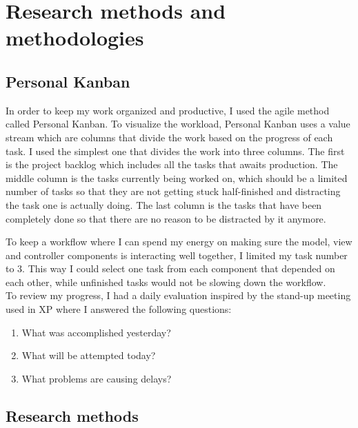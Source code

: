 
\chapter{Research methods and methodologies} %

\label{Chapter3} %


\section{Personal Kanban}
In order to keep my work organized and productive, I used the agile method called Personal Kanban. To visualize the workload, Personal Kanban uses a value stream which are columns that divide the work based on the progress of each task. I used the simplest one that divides the work into three columns. The first is the project backlog which includes all the tasks that awaits production. The middle column is the tasks currently being worked on, which should be a limited number of tasks so that they are not getting stuck half-finished and distracting the task one is actually doing. The last column is the tasks that have been completely done so that there are no reason to be distracted by it anymore. \parencite{Reference1}

To keep a workflow where I can spend my energy on making sure the model, view and controller components is interacting well together, I limited my task number to 3. This way I could select one task from each component that depended on each other, while unfinished tasks would not be slowing down the workflow.\\
To review my progress, I had a daily evaluation inspired by the stand-up meeting used in XP \parencite{Reference2} where I answered the following questions:
\begin{enumerate}
\item What was accomplished yesterday?
\item What will be attempted today?
\item What problems are causing delays?
\end{enumerate}



\section{Research methods}

